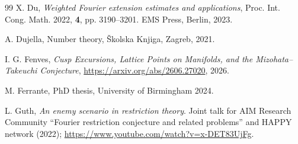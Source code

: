 \documentclass[11pt,reqno]{amsart}
\numberwithin{equation}{section}
\begin{document}
\begin{thebibliography}{99}
 X. Du, \textit{Weighted Fourier extension estimates and applications}, Proc. Int. Cong. Math. 2022, \textbf{4}, pp. 3190--3201. EMS Press, Berlin, 2023. 




 A. Dujella, Number theory, \v{S}kolska Knjiga, Zagreb, 2021.

 I. G. Fenves, \textit{Cusp Excursions, Lattice Points on Manifolds, and the Mizohata--Takeuchi Conjecture}, \url{https://arxiv.org/abs/2606.27020}, 2026.

 M. Ferrante, PhD thesis, University of Birmingham 2024.





 L. Guth, \textit{An enemy scenario in restriction theory}. Joint talk for AIM Research Community ``Fourier restriction conjecture and related problems'' and HAPPY network (2022); \url{https://www.youtube.com/watch?v=x-DET83UjFg}.



\end{thebibliography}
\end{document}
